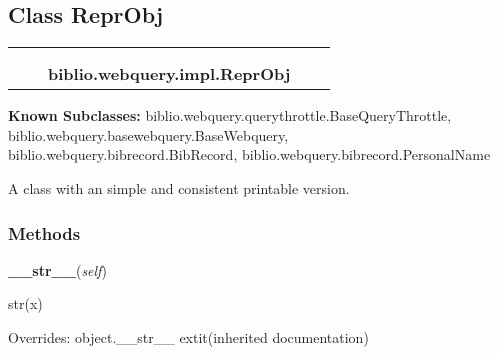 
\subsection{Class ReprObj}

    \label{biblio:webquery:impl:ReprObj}
\begin{tabular}{cccccc}
\multicolumn{2}{r}{\settowidth{\BCL}{object}\multirow{2}{\BCL}{object}}
&&
  \\\cline{3-3}
  &&\multicolumn{1}{c|}{}
&&
  \\
&&\multicolumn{2}{l}{\textbf{biblio.webquery.impl.ReprObj}}
\end{tabular}

\textbf{Known Subclasses:}
biblio.webquery.querythrottle.BaseQueryThrottle,
    biblio.webquery.basewebquery.BaseWebquery,
    biblio.webquery.bibrecord.BibRecord,
    biblio.webquery.bibrecord.PersonalName


A class with an simple and consistent printable version.


  \subsubsection{Methods}

    \vspace{0.5ex}

\hspace{.8\funcindent}\begin{boxedminipage}{\funcwidth}

    \raggedright \textbf{\_\_str\_\_}(\textit{self})

\setlength{\parskip}{2ex}
    str(x)

\setlength{\parskip}{1ex}
      Overrides: object.\_\_str\_\_ 	extit{(inherited documentation)}

    \end{boxedminipage}

